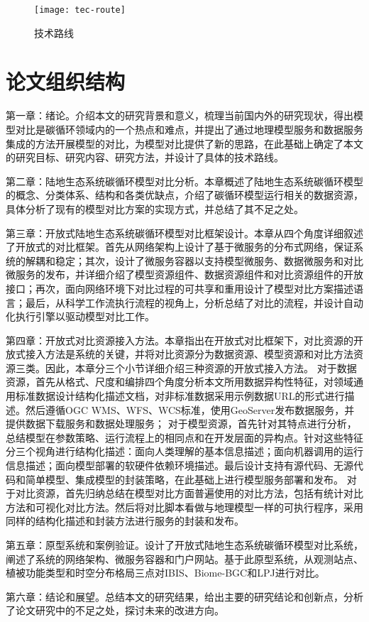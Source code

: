 \begin{figure}[!htbp]
    \centering
    \texttt{[image: tec-route]}
    \caption{技术路线}
    \label{fig:tec-route}
\end{figure}

\section{论文组织结构}
第一章：绪论。介绍本文的研究背景和意义，梳理当前国内外的研究现状，得出模型对比是碳循环领域内的一个热点和难点，并提出了通过地理模型服务和数据服务集成的方法开展模型的对比，为模型对比提供了新的思路，在此基础上确定了本文的研究目标、研究内容、研究方法，并设计了具体的技术路线。

第二章：陆地生态系统碳循环模型对比分析。本章概述了陆地生态系统碳循环模型的概念、分类体系、结构和各类优缺点，介绍了碳循环模型运行相关的数据资源，具体分析了现有的模型对比方案的实现方式，并总结了其不足之处。

第三章：开放式陆地生态系统碳循环模型对比框架设计。本章从四个角度详细叙述了开放式的对比框架。首先从网络架构上设计了基于微服务的分布式网络，保证系统的解耦和稳定；其次，设计了微服务容器以支持模型微服务、数据微服务和对比微服务的发布，并详细介绍了模型资源组件、数据资源组件和对比资源组件的开放接口；再次，面向网络环境下对比过程的可共享和重用设计了模型对比方案描述语言；最后，从科学工作流执行流程的视角上，分析总结了对比的流程，并设计自动化执行引擎以驱动模型对比工作。

第四章：开放式对比资源接入方法。本章指出在开放式对比框架下，对比资源的开放式接入方法是系统的关键，并将对比资源分为数据资源、模型资源和对比方法资源三类。因此，本章分三个小节详细介绍三种资源的开放式接入方法。
对于数据资源，首先从格式、尺度和编排四个角度分析本文所用数据异构性特征，对领域通用标准数据设计结构化描述文档，对非标准数据采用示例数据URL的形式进行描述。然后遵循OGC WMS、WFS、WCS标准，使用GeoServer发布数据服务，并提供数据下载服务和数据处理服务；
对于模型资源，首先针对其特点进行分析，总结模型在参数策略、运行流程上的相同点和在开发层面的异构点。针对这些特征分三个视角进行结构化描述：面向人类理解的基本信息描述；面向机器调用的运行信息描述；面向模型部署的软硬件依赖环境描述。最后设计支持有源代码、无源代码和简单模型、集成模型的封装策略，在此基础上进行模型服务部署和发布。
对于对比资源，首先归纳总结在模型对比方面普遍使用的对比方法，包括有统计对比方法和可视化对比方法。然后将对比脚本看做与地理模型一样的可执行程序，采用同样的结构化描述和封装方法进行服务的封装和发布。

第五章：原型系统和案例验证。设计了开放式陆地生态系统碳循环模型对比系统，阐述了系统的网络架构、微服务容器和门户网站。基于此原型系统，从观测站点、植被功能类型和时空分布格局三点对IBIS、Biome-BGC和LPJ进行对比。

第六章：结论和展望。总结本文的研究结果，给出主要的研究结论和创新点，分析了论文研究中的不足之处，探讨未来的改进方向。